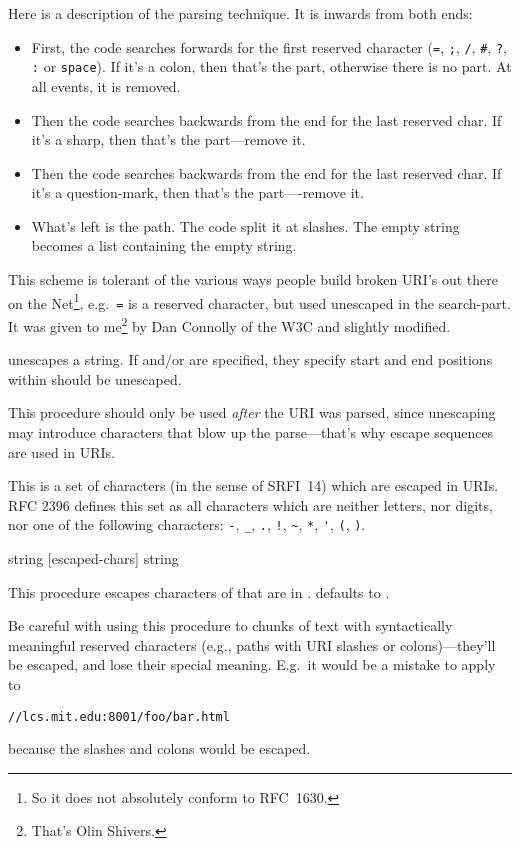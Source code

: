 Here is a description of the parsing technique. It is inwards from
both ends:
\begin{itemize}
\item First, the code searches forwards for the first reserved
  character (\verb|=|, \verb|;|, \verb|/|, \verb|#|, \verb|?|,
  \verb|:| or \verb|space|).  If it's a colon, then that's the
   part, otherwise there is no  part. At
  all events, it is removed.
\item Then the code searches backwards from the end for the last reserved
  char.  If it's a sharp, then that's the  part---remove it.
\item Then the code searches backwards from the end for the last reserved
  char.  If it's a question-mark, then that's the 
  part----remove it.
\item What's left is the path.  The code split it at slashes. The
  empty string becomes a list containing the empty string.
\end{itemize}
%  
This scheme is tolerant of the various ways people build broken
URI's out there on the Net\footnote{So it does not absolutely conform
  to RFC~1630.}, e.g.\ \verb|=| is a reserved character, but used
unescaped in the search-part. It was given to me\footnote{That's
  Olin Shivers.} by Dan Connolly of the W3C and slightly modified.

\begin{desc}
   unescapes a string. If  and/or  are
  specified, they specify start and end positions within 
  should be unescaped.
\end{desc}
%
This procedure should only be used \emph{after} the URI was parsed,
since unescaping may introduce characters that blow up the
parse---that's why escape sequences are used in URIs.

\begin{desc}
  This is a set of characters (in the sense of SRFI~14) which are
  escaped in URIs.  RFC 2396 defines this set as all characters which 
  are neither letters, nor digits, nor one of the following characters:
   \verb|-|, \verb|_|, \verb|.|, \verb|!|, %
   \verb|~|, \verb|*|, \verb|'|, \verb|(|, \verb|)|.
\end{desc}

 {string [escaped-chars]} {string}
\begin{desc}
  This procedure escapes characters of  that are in
  .  defaults to
  .  
\end{desc}
%
Be careful with using this procedure to chunks of text with
syntactically meaningful reserved characters (e.g., paths with URI
slashes or colons)---they'll be escaped, and lose their special
meaning. E.g.\ it would be a mistake to apply  to
\begin{verbatim}
//lcs.mit.edu:8001/foo/bar.html
\end{verbatim}
%
because the sla\-shes and co\-lons would be escaped.

